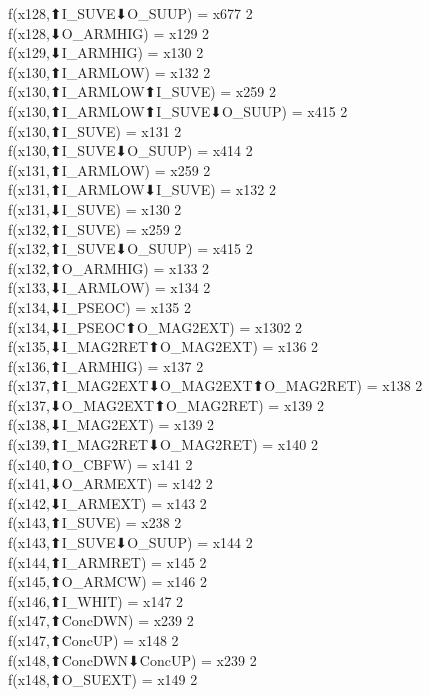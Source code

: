 f(x128,⬆I_SUVE⬇O_SUUP) = x677 {2} \\
f(x128,⬇O_ARMHIG) = x129 {2} \\
f(x129,⬇I_ARMHIG) = x130 {2} \\
f(x130,⬆I_ARMLOW) = x132 {2} \\
f(x130,⬆I_ARMLOW⬆I_SUVE) = x259 {2} \\
f(x130,⬆I_ARMLOW⬆I_SUVE⬇O_SUUP) = x415 {2} \\
f(x130,⬆I_SUVE) = x131 {2} \\
f(x130,⬆I_SUVE⬇O_SUUP) = x414 {2} \\
f(x131,⬆I_ARMLOW) = x259 {2} \\
f(x131,⬆I_ARMLOW⬇I_SUVE) = x132 {2} \\
f(x131,⬇I_SUVE) = x130 {2} \\
f(x132,⬆I_SUVE) = x259 {2} \\
f(x132,⬆I_SUVE⬇O_SUUP) = x415 {2} \\
f(x132,⬆O_ARMHIG) = x133 {2} \\
f(x133,⬇I_ARMLOW) = x134 {2} \\
f(x134,⬇I_PSEOC) = x135 {2} \\
f(x134,⬇I_PSEOC⬆O_MAG2EXT) = x1302 {2} \\
f(x135,⬇I_MAG2RET⬆O_MAG2EXT) = x136 {2} \\
f(x136,⬆I_ARMHIG) = x137 {2} \\
f(x137,⬆I_MAG2EXT⬇O_MAG2EXT⬆O_MAG2RET) = x138 {2} \\
f(x137,⬇O_MAG2EXT⬆O_MAG2RET) = x139 {2} \\
f(x138,⬇I_MAG2EXT) = x139 {2} \\
f(x139,⬆I_MAG2RET⬇O_MAG2RET) = x140 {2} \\
f(x140,⬆O_CBFW) = x141 {2} \\
f(x141,⬇O_ARMEXT) = x142 {2} \\
f(x142,⬇I_ARMEXT) = x143 {2} \\
f(x143,⬆I_SUVE) = x238 {2} \\
f(x143,⬆I_SUVE⬇O_SUUP) = x144 {2} \\
f(x144,⬆I_ARMRET) = x145 {2} \\
f(x145,⬆O_ARMCW) = x146 {2} \\
f(x146,⬆I_WHIT) = x147 {2} \\
f(x147,⬆ConcDWN) = x239 {2} \\
f(x147,⬆ConcUP) = x148 {2} \\
f(x148,⬆ConcDWN⬇ConcUP) = x239 {2} \\
f(x148,⬆O_SUEXT) = x149 {2} \\
